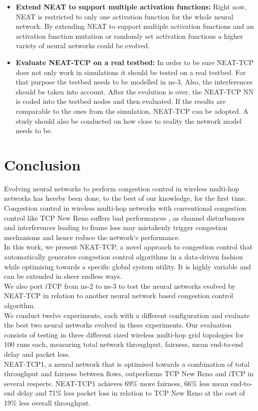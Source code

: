 \begin{itemize}
	\item{\textbf{Extend NEAT to support multiple activation functions:} Right now, NEAT is restricted to only one activation function for the whole neural network. By extending NEAT to support multiple activation functions and an activation function mutation or randomly set activation functions a higher variety of neural networks could be evolved.}
	\item{\textbf{Evaluate NEAT-TCP on a real testbed:} In order to be sure NEAT-TCP does not only work in simulations it should be tested on a real testbed. For that purpose the testbed needs to be modelled in ns-3. Also, the interferences should be taken into account. After the evolution is over, the NEAT-TCP NN is coded into the testbed nodes and then evaluated. If the results are comparable to the ones from the simulation, NEAT-TCP can be adopted. A study should also be conducted on how close to reality the network model needs to be.}
\end{itemize}

\chapter{Conclusion}\label{ch:conclusion} %
\glsresetall %
Evolving neural networks to perform congestion control in wireless multi-hop networks has hereby been done, to the best of our knowledge, for the first time. 
Congestion control in wireless multi-hop networks with conventional congestion control like TCP New Reno suffers bad performances \cite{wcp}, as channel disturbances and interferences leading to frame loss may mistakenly trigger congestion mechanisms and hence reduce the network`s performance.\\
In this work, we present NEAT-TCP, a novel approach to congestion control that automatically generates congestion control algorithms in a data-driven fashion while optimising towards a specific global system utility. It is highly variable and can be extended in sheer endless ways.\\
We also port iTCP from ns-2 to ns-3 to test the neural networks evolved by NEAT-TCP in relation to another neural network based congestion control algorithm. \\
We conduct twelve experiments, each with a different configuration and evaluate the best two neural networks evolved in these experiments. Our evaluation consists of testing in three different sized wireless multi-hop grid topologies for 100 runs each, measuring total network throughput, fairness, mean end-to-end delay and packet loss.\\
NEAT-TCP1, a neural network that is optimised towards a combination of total throughput and fairness between flows, outperforms TCP New Reno and iTCP in several respects. NEAT-TCP1  achieves 69\% more fairness, 66\% less mean end-to-end delay and 71\% less packet loss in relation to TCP New Reno at the cost of 19\% less overall throughput.




